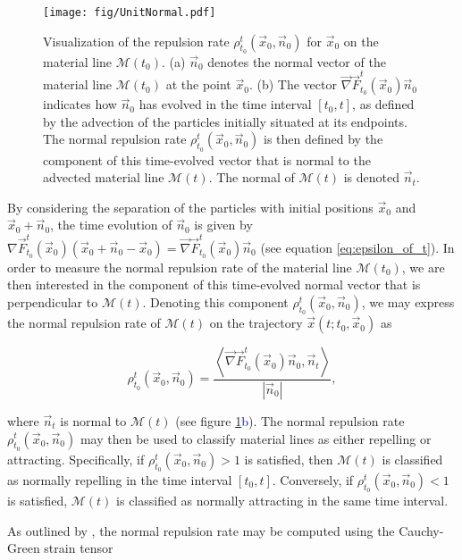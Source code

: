 \begin{figure}[h!] 
\centering
\texttt{[image: fig/UnitNormal.pdf]}
\caption{Visualization of the repulsion rate $\rho_{t_0}^t(\vec{x}_0,\vec{n}_0)$ for $\vec{x}_0$ on the material line $\mathcal{M}(t_0)$. (a) $\vec{n}_0$ denotes the normal vector of the material line $\mathcal{M}(t_0)$ at the point $\vec{x}_0$. (b) The vector $\vec{\nabla}\vec{F}_{t_0}^t(\vec{x}_0)\vec{n}_0$ indicates how $\vec{n}_0$ has evolved in the time interval $[t_0,t]$, as defined by the advection of the particles initially situated at its endpoints. The normal repulsion rate $\rho_{t_0}^t(\vec{x}_0,\vec{n}_0)$ is then defined by the component of this time-evolved vector that is normal to the advected material line $\mathcal{M}(t)$. The normal of $\mathcal{M}(t)$ is denoted $\vec{n}_t$.}
\label{fig:UnitNormal}
\end{figure} 

By considering the separation of the particles with initial positions $\vec{x}_0$ and $\vec{x}_0 + \vec{n}_0$, the time evolution of $\vec{n}_0$ is given by $\nabla \vec{F}_{t_0}^t(\vec{x}_0)(\vec{x}_0+\vec{n}_0 - \vec{x}_0) = \vec{\nabla}\vec{F}_{t_0}^t(\vec{x}_0)\vec{n}_0$ (see equation \eqref{eq:epsilon_of_t}). In order to measure the normal repulsion rate of the material line $\mathcal{M}(t_0)$, we are then interested in the component of this time-evolved normal vector that is perpendicular to $\mathcal{M}(t)$. Denoting this component $\rho_{t_0}^t(\vec{x}_0,\vec{n}_0)$, we may express the normal repulsion rate of $\mathcal{M}(t)$ on the trajectory $\vec{x}(t;t_0,\vec{x}_0)$ as

\begin{equation}
	\rho_{t_0}^t(\vec{x}_0,\vec{n}_0) = \frac{\left\langle \vec{\nabla}\vec{F}_{t_0}^t(\vec{x}_0)\vec{n}_0,\vec{n}_t \right\rangle}{\left|\vec{n}_0\right|},
\end{equation}

\noindent where $\vec{n}_t$ is normal to $\mathcal{M}(t)$ (see figure \ref{fig:UnitNormal}\textcolor{blue}{b}). The normal repulsion rate $\rho_{t_0}^t(\vec{x}_0,\vec{n}_0)$ may then be used to classify material lines as either repelling or attracting. Specifically, if $\rho_{t_0}^t(\vec{x}_0,\vec{n}_0) > 1$ is satisfied, then $\mathcal{M}(t)$ is classified as normally repelling in the time interval $[t_0,t]$. Conversely, if $\rho_{t_0}^t(\vec{x}_0,\vec{n}_0) < 1$ is satisfied, $\mathcal{M}(t)$ is classified as normally attracting in the same time interval. 

As outlined by \cite{Haller12}, the normal repulsion rate may be computed using the Cauchy-Green strain tensor

